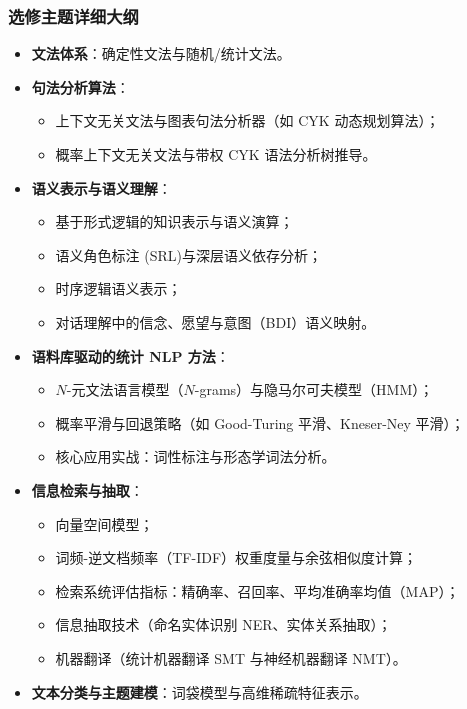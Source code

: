 \subsubsection{选修主题详细大纲}
\begin{itemize}
    \item \textbf{文法体系}：确定性文法与随机/统计文法。
    \item \textbf{句法分析算法}：
    \begin{itemize}
        \item 上下文无关文法与图表句法分析器（如 CYK 动态规划算法）；
        \item 概率上下文无关文法与带权 CYK 语法分析树推导。
    \end{itemize}
    \item \textbf{语义表示与语义理解}：
    \begin{itemize}
        \item 基于形式逻辑的知识表示与语义演算；
        \item 语义角色标注 (SRL)与深层语义依存分析；
        \item 时序逻辑语义表示；
        \item 对话理解中的信念、愿望与意图（BDI）语义映射。
    \end{itemize}
    \item \textbf{语料库驱动的统计 NLP 方法}：
    \begin{itemize}
        \item $N$-元文法语言模型（$N$-grams）与隐马尔可夫模型（HMM）；
        \item 概率平滑与回退策略（如 Good-Turing 平滑、Kneser-Ney 平滑）；
        \item 核心应用实战：词性标注与形态学词法分析。
    \end{itemize}
    \item \textbf{信息检索与抽取}：
    \begin{itemize}
        \item 向量空间模型；
        \item 词频-逆文档频率（TF-IDF）权重度量与余弦相似度计算；
        \item 检索系统评估指标：精确率、召回率、平均准确率均值（MAP）；
        \item 信息抽取技术（命名实体识别 NER、实体关系抽取）；
        \item 机器翻译（统计机器翻译 SMT 与神经机器翻译 NMT）。
    \end{itemize}
    \item \textbf{文本分类与主题建模}：词袋模型与高维稀疏特征表示。

\end{itemize}
